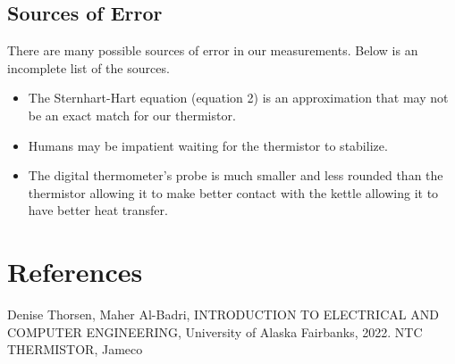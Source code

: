 \documentclass{article}
\begin{document}
\subsection{Sources of Error}
There are many possible sources of error in our measurements. Below is an incomplete list of the sources.

\begin{itemize}
	\item The Sternhart-Hart equation (equation 2) is an approximation that may not be an exact match for our thermistor.
	\item Humans may be impatient waiting for the thermistor to stabilize.
	\item The digital thermometer's probe is much smaller and less rounded than the thermistor allowing it to make better contact with the kettle allowing it to have better heat transfer.
\end{itemize}


\newpage
\section{References}
\noindent
[1] Denise Thorsen, Maher Al-Badri, INTRODUCTION TO ELECTRICAL AND COMPUTER ENGINEERING, University of Alaska Fairbanks, 2022.
\newline
\newline
\noindent
[2] NTC THERMISTOR, Jameco
\end{document}
